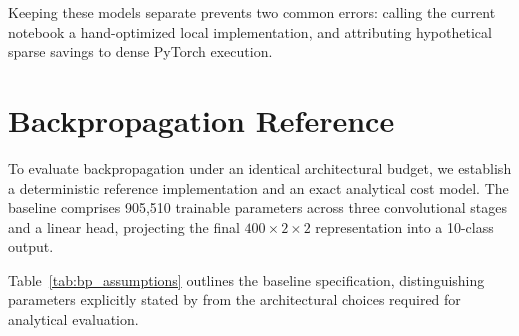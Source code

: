 \documentclass{article}
\begin{document}
    Keeping these models separate prevents two common errors: calling the current notebook a hand-optimized local implementation, and attributing hypothetical sparse savings to dense PyTorch execution.
    
    \section{Backpropagation Reference}
    \label{sec:bp_reference}
    
    To evaluate backpropagation under an identical architectural budget, we establish a deterministic reference implementation and an exact analytical cost model. The baseline comprises 905,510 trainable parameters across three convolutional stages and a linear head, projecting the final $400 \times 2 \times 2$ representation into a 10-class output.
    
    Table~\ref{tab:bp_assumptions} outlines the baseline specification, distinguishing parameters explicitly stated by \citet{gupta2023bio} from the architectural choices required for analytical evaluation.
\end{document}
